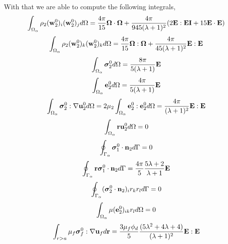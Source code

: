 With that we are able to compute the following integrals,
\begin{equation*}
    \int_{\Omega_\alpha} \rho_2(\textbf{w}_2^0)_i (\textbf{w}_2^0)_j d\Omega
    = \frac{4\pi}{15}\bm\Omega\cdot\bm\Omega
    + \frac{4\pi}{945(\lambda+1)^2}
    (2\textbf{E}:\textbf{EI} + 15 \textbf{E}\cdot \textbf{E})
\end{equation*}
\begin{equation*}
    \int_{\Omega_\alpha} \rho_2(\textbf{w}_2^0)_k (\textbf{w}_2^0)_k d\Omega
    = \frac{4\pi}{15}\bm\Omega:\bm\Omega
    + \frac{4\pi}{45(\lambda+1)^2}
    \textbf{E}:\textbf{E} 
\end{equation*} 
\begin{equation*}
    \int_{\Omega_\alpha} \bm\sigma_2^0 d\Omega
    = \frac{8\pi}{5(\lambda+1)}
    \textbf{E}
\end{equation*}
\begin{equation*}
    \int_{\Omega_\alpha} \textbf{e}_2^0 d\Omega
    = \frac{4\pi}{5(\lambda+1)}
    \textbf{E}
\end{equation*}
\begin{equation*}
    \int_{\Omega_\alpha} \bm{\sigma}_2^0:\mathbf{\nabla} \textbf{u}_2^0 d\Omega
    = 2\mu_2 \int_{\Omega_\alpha} \textbf{e}_2^0: \textbf{e}_2^0  d\Omega
    = 
    \frac{4\pi}{(\lambda+1)^2}\textbf{E}:\textbf{E}
\end{equation*}
\begin{align*}
    \int_{\Omega_\alpha} \textbf{r}\textbf{u}_2^0 d\Omega
    = 0 
\end{align*}
\begin{equation*}
    \oint_{\Gamma_\alpha} \bm\sigma_1^0\cdot \textbf{n}_2 d\Gamma
    = 0
\end{equation*}
\begin{equation*}
    \oint_{\Gamma_\alpha} \textbf{r}\bm\sigma_1^0\cdot \textbf{n}_2 d\Gamma
    = \frac{4\pi}{5}\frac{5\lambda+2}{\lambda+1}\textbf{E} 
\end{equation*}
\begin{equation*}
    \oint_{\Gamma_\alpha} (\bm\sigma_2^0\cdot \textbf{n}_2)_i r_kr_l d\Gamma
    = 0
\end{equation*}
\begin{equation*}
    \int_{\Omega_\alpha} \mu(\textbf{e}_2^0)_{ik} r_l d\Omega =
    0
\end{equation*}
\begin{equation*}
    \int_{r>a} \mu_f \bm\sigma^0_f:\mathbf{\nabla} \textbf{u}_f  d\textbf{r}
    = 
    \frac{3\mu_f \phi_d}{5}
    \frac{(5\lambda^2 + 4\lambda +4)}{(\lambda + 1)^2}
    \textbf{E}:\textbf{E}
\end{equation*}